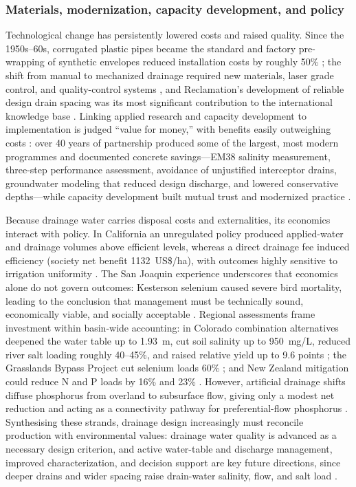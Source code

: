 \subsubsection{Materials, modernization, capacity development, and policy}

Technological change has persistently lowered costs and raised quality. Since the
1950s--60s, corrugated plastic pipes became the standard and factory pre-wrapping
of synthetic envelopes reduced installation costs by roughly 50\%
\parencite{Yannopoulos2020}; the shift from manual to mechanized drainage required
new materials, laser grade control, and quality-control systems
\parencite{Ritzema2006,AbdelDayem2007,Ritzema2007}, and Reclamation's development
of reliable design drain spacing was its most significant contribution to the
international knowledge base \parencite{TeKrony2004}. Linking applied research and
capacity development to implementation is judged ``value for money,'' with
benefits easily outweighing costs \parencite{Ritzema2007}: over 40 years of
partnership produced some of the largest, most modern programmes and documented
concrete savings---EM38 salinity measurement, three-step performance assessment,
avoidance of unjustified interceptor drains, groundwater modeling that reduced
design discharge, and lowered conservative depths---while capacity development
built mutual trust and modernized practice
\parencite{Ritzema2007,Ritzema2008,Ritzema2006}.

Because drainage water carries disposal costs and externalities, its economics
interact with policy. In California an unregulated policy produced applied-water
and drainage volumes above efficient levels, whereas a direct drainage fee induced
efficiency (society net benefit 1132~US\$/ha), with outcomes highly sensitive to
irrigation uniformity \parencite{DINAR1989}. The San Joaquin experience underscores
that economics alone do not govern outcomes: Kesterson selenium caused severe bird
mortality, leading to the conclusion that management must be technically sound,
economically viable, and socially acceptable \parencite{Letey1999}. Regional
assessments frame investment within basin-wide accounting: in Colorado combination
alternatives deepened the water table up to 1.93~m, cut soil salinity up to
950~mg/L, reduced river salt loading roughly 40--45\%, and raised relative yield up
to 9.6 points \parencite{Burkhalter2006}; the Grasslands Bypass Project cut
selenium loads 60\% \parencite{Quinn2009}; and New Zealand mitigation could reduce
N and P loads by 16\% and 23\% \parencite{McDowell2021}. However, artificial
drainage shifts diffuse phosphorus from overland to subsurface flow, giving only a
modest net reduction and acting as a connectivity pathway for preferential-flow
phosphorus \parencite{Lucci2014,Allaire2011,Dadfar2010}. Synthesising
these strands, drainage design increasingly must reconcile production with
environmental values: drainage water quality is advanced as a necessary design
criterion, and active water-table and discharge management, improved
characterization, and decision support are key future directions, since deeper
drains and wider spacing raise drain-water salinity, flow, and salt load
\parencite{Ayars2015,Yannopoulos2020,Ritzema2023}.

